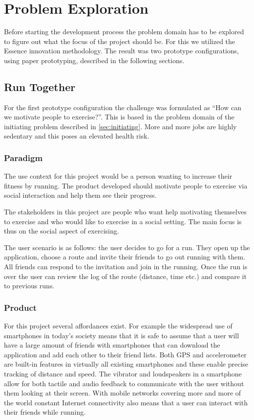 \section{Problem Exploration}
\label{sec:problem-exp}
Before starting the development process the problem domain has to be explored to figure out what the focus of the project should be. For this we utilized the Essence innovation methodology. The result was two prototype configurations, using paper prototyping, described in the following sections.

\subsection{Run Together}
For the first prototype configuration the challenge was formulated as ``How can we motivate people to exercise?''. This is based in the problem domain of the initiating problem described in \autoref{sec:initiating}. More and more jobs are highly sedentary and this poses an elevated health risk. 

\subsubsection{Paradigm}
The use context for this project would be a person wanting to increase their fitness by running. The product developed should motivate people to exercise via social interaction and help them see their progress.

The stakeholders in this project are people who want help motivating themselves to exercise and who would like to exercise in a social setting. The main focus is thus on the social aspect of exercising. 

The user scenario is as follows: the user decides to go for a run. They open up the application, choose a route and invite their friends to go out running with them. All friends can respond to the invitation and join in the running. Once the run is over the user can review the log of the route (distance, time etc.) and compare it to previous runs.  

\subsubsection{Product}
For this project several affordances exist. For example the widespread use of smartphones in today's society means that it is safe to assume that a user will have a large amount of friends with smartphones that can download the application and add each other to their friend lists. Both \ac{GPS} and accelerometer are built-in features in virtually all existing smartphones and these enable precise tracking of distance and speed. The vibrator and loudspeakers in a smartphone allow for both tactile and audio feedback to communicate with the user without them looking at their screen. With mobile networks covering more and more of the world constant Internet connectivity also means that a user can interact with their friends while running.

